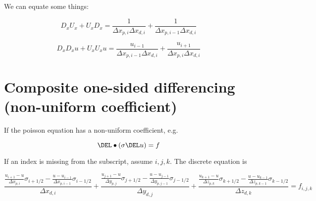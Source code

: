 \documentclass[11pt]{article}
\begin{document}
We can equate some things:

\begin{equation}
	D_x U_x +
	U_x D_x
	=
	\frac{1}{\Delta x_{p,i} \Delta x_{d,i}}
	+
	\frac{1}{\Delta x_{p,i-1} \Delta x_{d,i}}
\end{equation}

\begin{equation}
	D_x D_x u +
	U_x U_x u
	=
	\frac{u_{i-1}}{\Delta x_{p,i-1} \Delta x_{d,i}}
	+
	\frac{u_{i+1}}{\Delta x_{p,i} \Delta x_{d,i}}
\end{equation}

\section{Composite one-sided differencing (non-uniform coefficient)}

If the poisson equation has a non-uniform coefficient, e.g.

\begin{equation}
	\DEL \bullet \left( \sigma \DEL u \right) = f
\end{equation}

If an index is missing from the subscript, assume $i,j,k$. The discrete equation is

\begin{equation}
	\frac{\frac{u_{i+1}-u}{\Delta x_{p,i}} \sigma_{i+1/2} - \frac{u-u_{i-1}}{\Delta x_{p,i-1}} \sigma_{i-1/2}}{\Delta x_{d,i}} +
	\frac{\frac{u_{j+1}-u}{\Delta y_{p,j}} \sigma_{j+1/2} - \frac{u-u_{j-1}}{\Delta y_{p,j-1}} \sigma_{j-1/2}}{\Delta y_{d,j}} +
	\frac{\frac{u_{k+1}-u}{\Delta z_{p,k}} \sigma_{k+1/2} - \frac{u-u_{k-1}}{\Delta z_{p,k-1}} \sigma_{k-1/2}}{\Delta z_{d,k}} = f_{i,j,k}
\end{equation}
\end{document}
